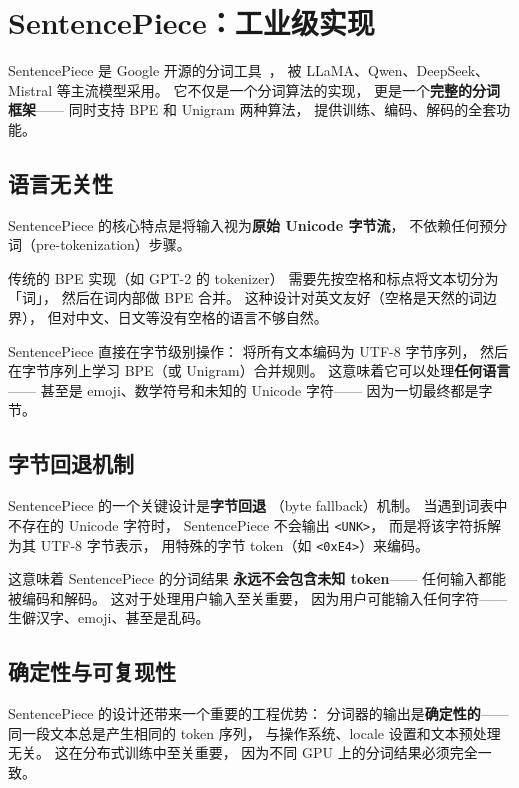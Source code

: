 \section{SentencePiece：工业级实现}

SentencePiece 是 Google 开源的分词工具~\cite{kudo2018sentencepiece}，
被 LLaMA、Qwen、DeepSeek、Mistral 等主流模型采用。
它不仅是一个分词算法的实现，
更是一个\textbf{完整的分词框架}——
同时支持 BPE 和 Unigram 两种算法，
提供训练、编码、解码的全套功能。

\subsection{语言无关性}

SentencePiece 的核心特点是将输入视为\textbf{原始 Unicode 字节流}，
不依赖任何预分词（pre-tokenization）步骤。

传统的 BPE 实现（如 GPT-2 的 tokenizer）
需要先按空格和标点将文本切分为「词」，
然后在词内部做 BPE 合并。
这种设计对英文友好（空格是天然的词边界），
但对中文、日文等没有空格的语言不够自然。

SentencePiece 直接在字节级别操作：
将所有文本编码为 UTF-8 字节序列，
然后在字节序列上学习 BPE（或 Unigram）合并规则。
这意味着它可以处理\textbf{任何语言}——
甚至是 emoji、数学符号和未知的 Unicode 字符——
因为一切最终都是字节。

\subsection{字节回退机制}

SentencePiece 的一个关键设计是\textbf{字节回退}
（byte fallback）机制。
当遇到词表中不存在的 Unicode 字符时，
SentencePiece 不会输出 \texttt{<UNK>}，
而是将该字符拆解为其 UTF-8 字节表示，
用特殊的字节 token（如 \texttt{<0xE4>}）来编码。

这意味着 SentencePiece 的分词结果
\textbf{永远不会包含未知 token}——
任何输入都能被编码和解码。
这对于处理用户输入至关重要，
因为用户可能输入任何字符——
生僻汉字、emoji、甚至是乱码。

\subsection{确定性与可复现性}

SentencePiece 的设计还带来一个重要的工程优势：
分词器的输出是\textbf{确定性的}——
同一段文本总是产生相同的 token 序列，
与操作系统、locale 设置和文本预处理无关。
这在分布式训练中至关重要，
因为不同 GPU 上的分词结果必须完全一致。


